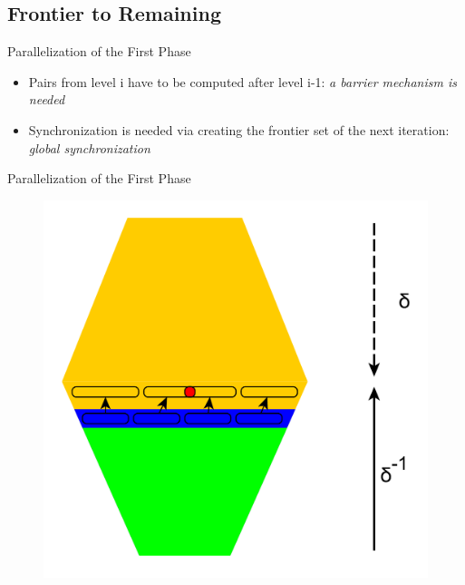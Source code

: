 \documentclass{beamer}
\begin{document}
\subsection{Frontier to Remaining}

\begin{frame}{Parallelization of the First Phase}
	\begin{itemize}
		\item Pairs from level i have to be computed after  level i-1: \emph{a barrier mechanism is needed}
		\item Synchronization is needed via creating the frontier set of the next iteration: \emph{global synchronization}
	\end{itemize}
\end{frame}


\begin{frame}{Parallelization of the First Phase}
	\begin{figure}
		\includegraphics[height=\textheight]{figs/f2r_parallel.pdf}
	\end{figure}
\end{frame}
\end{document}
